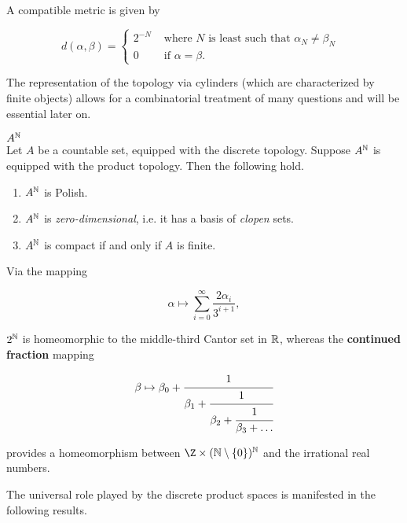 A compatible metric is given by

\begin{equation}
d(\alpha,\beta) = \begin{cases}
    2^{-N} & \text{ where } N \text{ is least such that $\alpha_N \neq \beta_N$ }\\
    0 & \text{ if $\alpha = \beta$}.
\end{cases}
\end{equation}

The representation of the topology via cylinders (which are characterized by finite objects) allows for a combinatorial treatment of many questions and will be essential later on.

\begin{proposition}\label{prop-topological-product}\textbf{$A^{\mathbb{N}}$}\\
Let $A$ be a countable set, equipped with the discrete topology. Suppose $A^{\mathbb{N}}$ is equipped with the product topology. Then the following hold.

\begin{enumerate}
\item $A^{\mathbb{N}}$ is Polish.
\item $A^{\mathbb{N}}$ is \textit{zero-dimensional}, i.e. it has a basis of \textit{clopen} sets.
\item $A^{\mathbb{N}}$ is compact if and only if $A$ is finite.
\end{enumerate}

\end{proposition}Via the mapping

\begin{equation}
\alpha \mapsto \sum_{i = 0}^\infty \frac{2\alpha_i}{3^{i+1}},
\end{equation}

$2^{\mathbb{N}}$ is homeomorphic to the middle-third Cantor set in $\mathbb{R}$, whereas the \textbf{continued fraction} mapping

\begin{equation}
\beta \mapsto \beta_0 + \cfrac{1}
        {\beta_1 + \cfrac{1}{
                \beta_2 + \cfrac{1}{
                        \beta_3 + \ldots}}}
\end{equation}

provides a homeomorphism between $\Z \times (\N\setminus\{0\})^\N$ and the irrational real numbers.

The universal role played by the discrete product spaces is manifested in the following results.

